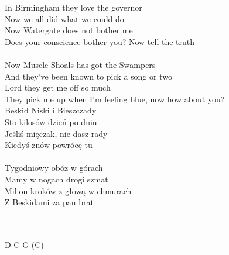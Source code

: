 \documentclass[a5paper, 10pt]{book}
\begin{document}
\begin{minipage}[t]{0.8\textwidth}
  In Birmingham they love the governor\\
  Now we all did what we could do\\
  Now Watergate does not bother me\\
  Does your conscience bother you? Now tell the truth\\
  \\
  Now Muscle Shoals has got the Swampers\\
  And they've been known to pick a song or two\\
  Lord they get me off so much\\
  They pick me up when I'm feeling blue, now how about you?\\
  
  \hspace*{6mm}Beskid Niski i Bieszczady\\
  \hspace*{6mm}Sto kilosów dzień po dniu\\
  \hspace*{6mm}Jeśliś mięczak, nie dasz rady\\
  \hspace*{6mm}Kiedyś znów powrócę tu\\
\\
  \hspace*{6mm}Tygodniowy obóz w górach\\
  \hspace*{6mm}Mamy w nogach drogi szmat\\
  \hspace*{6mm}Milion kroków z głową w chmurach\\
  \hspace*{6mm}Z Beskidami za pan brat\\
  \\
  \\
  \end{minipage}
  \begin{minipage}[t]{0.2\textwidth}
    D C G (C)\\
    \end{minipage}


\end{document}

